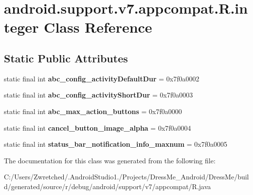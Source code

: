 \hypertarget{classandroid_1_1support_1_1v7_1_1appcompat_1_1_r_1_1integer}{}\section{android.\+support.\+v7.\+appcompat.\+R.\+integer Class Reference}
\label{classandroid_1_1support_1_1v7_1_1appcompat_1_1_r_1_1integer}
\subsection*{Static Public Attributes}
\begin{DoxyCompactItemize}
\item 
\hypertarget{classandroid_1_1support_1_1v7_1_1appcompat_1_1_r_1_1integer_a4fb2e7826a35c40f397f9f14b86a0c7d}{}static final int {\bfseries abc\+\_\+config\+\_\+activity\+Default\+Dur} = 0x7f0a0002\label{classandroid_1_1support_1_1v7_1_1appcompat_1_1_r_1_1integer_a4fb2e7826a35c40f397f9f14b86a0c7d}

\item 
\hypertarget{classandroid_1_1support_1_1v7_1_1appcompat_1_1_r_1_1integer_a6687bb8055a5a731b1429884734c9565}{}static final int {\bfseries abc\+\_\+config\+\_\+activity\+Short\+Dur} = 0x7f0a0003\label{classandroid_1_1support_1_1v7_1_1appcompat_1_1_r_1_1integer_a6687bb8055a5a731b1429884734c9565}

\item 
\hypertarget{classandroid_1_1support_1_1v7_1_1appcompat_1_1_r_1_1integer_ab30eab0a2cb415ca7fd68f2c56b48817}{}static final int {\bfseries abc\+\_\+max\+\_\+action\+\_\+buttons} = 0x7f0a0000\label{classandroid_1_1support_1_1v7_1_1appcompat_1_1_r_1_1integer_ab30eab0a2cb415ca7fd68f2c56b48817}

\item 
\hypertarget{classandroid_1_1support_1_1v7_1_1appcompat_1_1_r_1_1integer_a21ede1655715ffc1421fbd057706bfa8}{}static final int {\bfseries cancel\+\_\+button\+\_\+image\+\_\+alpha} = 0x7f0a0004\label{classandroid_1_1support_1_1v7_1_1appcompat_1_1_r_1_1integer_a21ede1655715ffc1421fbd057706bfa8}

\item 
\hypertarget{classandroid_1_1support_1_1v7_1_1appcompat_1_1_r_1_1integer_a52a3923b3d9ba3b58e218794b30683dc}{}static final int {\bfseries status\+\_\+bar\+\_\+notification\+\_\+info\+\_\+maxnum} = 0x7f0a0005\label{classandroid_1_1support_1_1v7_1_1appcompat_1_1_r_1_1integer_a52a3923b3d9ba3b58e218794b30683dc}

\end{DoxyCompactItemize}


The documentation for this class was generated from the following file\+:\begin{DoxyCompactItemize}
\item 
C\+:/\+Users/\+Zwretched/.\+Android\+Studio1./\+Projects/\+Dress\+Me\+\_\+\+Android/\+Dress\+Me/build/generated/source/r/debug/android/support/v7/appcompat/R.\+java\end{DoxyCompactItemize}
